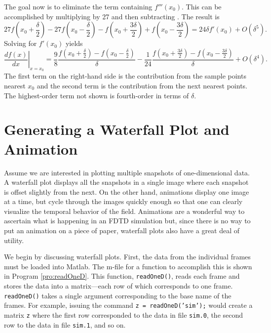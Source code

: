 The goal now is to eliminate the term containing $f'''(x_0)$.  This
can be accomplished by multiplying  by 27 and then
subtracting .  The result is
\begin{equation}
  27 f\!\left(x_0+\frac{\delta}{2}\right) -
  27 f\!\left(x_0-\frac{\delta}{2}\right) 
  - f\!\left(x_0+\frac{3\delta}{2}\right) +
  f\!\left(x_0-\frac{3\delta}{2}\right) =
    24 \delta f'(x_0) + O(\delta^5).
\end{equation}
Solving for $f'(x_0)$ yields
\begin{equation}
  \left.\frac{df(x)}{dx}\right|_{x=x_0} = \frac{9}{8} 
  \frac{f\!\left(x_0+\frac{\delta}{2}\right) -
        f\!\left(x_0-\frac{\delta}{2}\right)}{\delta}
  -\frac{1}{24}
  \frac{f\!\left(x_0+\frac{3\delta}{2}\right) -
        f\!\left(x_0-\frac{3\delta}{2}\right)}{\delta}
    + O(\delta^4).
\end{equation}
The first term on the right-hand side is the contribution from the
sample points nearest $x_0$ and the second term is the contribution
from the next nearest points.  The highest-order term not shown is
fourth-order in terms of $\delta$.  

\chapter{Generating a Waterfall Plot and Animation
\label{ap:waterfall}} 


Assume we are interested in plotting multiple snapshots of
one-dimensional data.  A waterfall plot displays all the snapshots in
a single image where each snapshot is offset slightly from the next.
On the other hand, animations display one image at a time, but
cycle through the images quickly enough so that one can clearly
visualize the temporal behavior of the field.  Animations are a
wonderful way to ascertain what is happening in an FDTD simulation
but, since there is no way to put an animation on a piece of paper,
waterfall plots also have a great deal of utility.  

We begin by discussing waterfall plots.  First, the data from the
individual frames must be loaded into Matlab.  The m-file for a
function to accomplish this is shown in Program
\ref{pro:readOneD}.  This function, {\tt readOneD()}, reads each frame
and stores the data into a matrix---each row of which corresponds to
one frame.  {\tt readOneD()} takes a single argument corresponding to
the base name of the frames.  For example, issuing the command {\tt z
= readOneD('sim');} would create a matrix {\tt z} where the first row
corresponded to the data in file {\tt sim.0}, the second row to the
data in file {\tt sim.1}, and so on.

